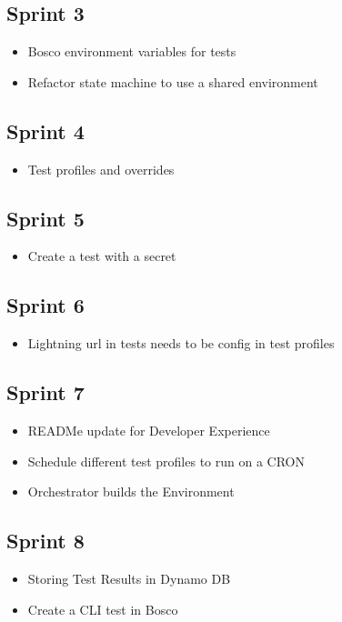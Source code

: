 \documentclass[12pt,a4paper,titlepage]{report}
\begin{document}
\subsection*{Sprint 3}
\begin{itemize}
\item Bosco environment variables for tests
\item Refactor state machine to use a shared environment
\end{itemize}

\subsection*{Sprint 4}
\begin{itemize}
\item Test profiles and overrides
\end{itemize}

\subsection*{Sprint 5}
\begin{itemize}
\item Create a test with a secret
\end{itemize}

\subsection*{Sprint 6}
\begin{itemize}
\item Lightning url in tests needs to be config in test profiles
\end{itemize}

\subsection*{Sprint 7}
\begin{itemize}
\item READMe update for Developer Experience
\item Schedule different test profiles to run on a CRON
\item Orchestrator builds the Environment
\end{itemize}

\subsection*{Sprint 8}
\begin{itemize}
\item Storing Test Results in Dynamo DB
\item Create a CLI test in Bosco
\end{itemize}
\end{document}

